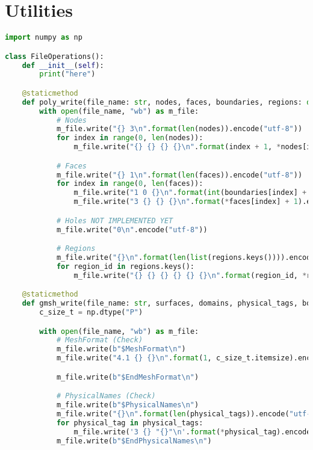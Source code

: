 \section{Utilities}
\begin{lstlisting}[language=Python,caption={Class defining parsers and writers for commonly used file types. Here .gmsh and .poly are covered.},captionpos=b,label=lst:file_ops_class]
import numpy as np

class FileOperations():
    def __init__(self):
        print("here")

    @staticmethod
    def poly_write(file_name: str, nodes, faces, boundaries, regions: dict):
        with open(file_name, "wb") as m_file:
            # Nodes
            m_file.write("{} 3\n".format(len(nodes)).encode("utf-8"))
            for index in range(0, len(nodes)):
                m_file.write("{} {} {} {}\n".format(index + 1, *nodes[index]).encode("utf-8"))

            # Faces
            m_file.write("{} 1\n".format(len(faces)).encode("utf-8"))
            for index in range(0, len(faces)):
                m_file.write("1 0 {}\n".format(int(boundaries[index] + 1)).encode("utf-8"))
                m_file.write("3 {} {} {}\n".format(*faces[index] + 1).encode("utf-8"))

            # Holes NOT IMPLEMENTED YET
            m_file.write("0\n".encode("utf-8"))

            # Regions
            m_file.write("{}\n".format(len(list(regions.keys()))).encode("utf-8"))
            for region_id in regions.keys():
                m_file.write("{} {} {} {} {} {}\n".format(region_id, *regions[region_id]['coordinates'], region_id, regions[region_id]['max_volume']).encode("utf-8"))

    @staticmethod
    def gmsh_write(file_name: str, surfaces, domains, physical_tags, bounding_surface_tag):
        c_size_t = np.dtype("P")

        with open(file_name, "wb") as m_file:
            # MeshFormat (Check)
            m_file.write(b"$MeshFormat\n")
            m_file.write("4.1 {} {}\n".format(1, c_size_t.itemsize).encode("utf-8"))

            m_file.write(b"$EndMeshFormat\n")

            # PhysicalNames (Check)
            m_file.write(b"$PhysicalNames\n")
            m_file.write("{}\n".format(len(physical_tags)).encode("utf-8"))
            for physical_tag in physical_tags:
                m_file.write('3 {} "{}"\n'.format(*physical_tag).encode("utf-8"))
            m_file.write(b"$EndPhysicalNames\n")


\end{lstlisting}

